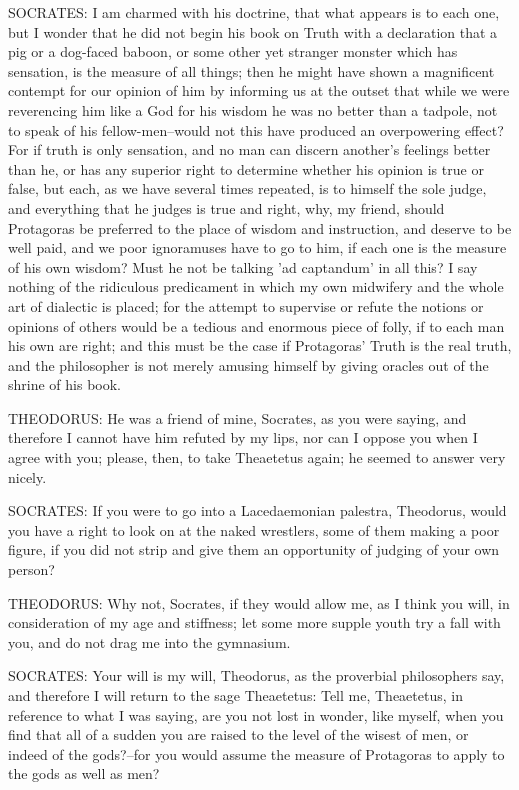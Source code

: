 SOCRATES: I am charmed with his doctrine, that what appears is to
each one, but I wonder that he did not begin his book on Truth with a
declaration that a pig or a dog-faced baboon, or some other yet stranger
monster which has sensation, is the measure of all things; then he might
have shown a magnificent contempt for our opinion of him by informing
us at the outset that while we were reverencing him like a God for
his wisdom he was no better than a tadpole, not to speak of his
fellow-men--would not this have produced an overpowering effect? For
if truth is only sensation, and no man can discern another's feelings
better than he, or has any superior right to determine whether his
opinion is true or false, but each, as we have several times repeated,
is to himself the sole judge, and everything that he judges is true and
right, why, my friend, should Protagoras be preferred to the place
of wisdom and instruction, and deserve to be well paid, and we poor
ignoramuses have to go to him, if each one is the measure of his own
wisdom? Must he not be talking 'ad captandum' in all this? I say nothing
of the ridiculous predicament in which my own midwifery and the whole
art of dialectic is placed; for the attempt to supervise or refute the
notions or opinions of others would be a tedious and enormous piece of
folly, if to each man his own are right; and this must be the case if
Protagoras' Truth is the real truth, and the philosopher is not merely
amusing himself by giving oracles out of the shrine of his book.

THEODORUS: He was a friend of mine, Socrates, as you were saying, and
therefore I cannot have him refuted by my lips, nor can I oppose you
when I agree with you; please, then, to take Theaetetus again; he seemed
to answer very nicely.

SOCRATES: If you were to go into a Lacedaemonian palestra, Theodorus,
would you have a right to look on at the naked wrestlers, some of them
making a poor figure, if you did not strip and give them an opportunity
of judging of your own person?

THEODORUS: Why not, Socrates, if they would allow me, as I think you
will, in consideration of my age and stiffness; let some more supple
youth try a fall with you, and do not drag me into the gymnasium.

SOCRATES: Your will is my will, Theodorus, as the proverbial
philosophers say, and therefore I will return to the sage Theaetetus:
Tell me, Theaetetus, in reference to what I was saying, are you not
lost in wonder, like myself, when you find that all of a sudden you are
raised to the level of the wisest of men, or indeed of the gods?--for
you would assume the measure of Protagoras to apply to the gods as well
as men?

